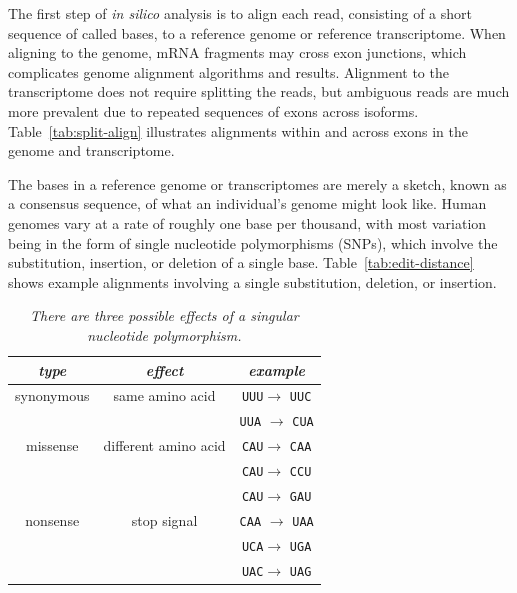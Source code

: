 \documentclass[11pt]{report}
\newcommand{\mybase}[1]{\texttt{#1}\xspace}
\newcommand{\baseA}{\mybase{A}}
\newcommand{\baseC}{\mybase{C}}
\newcommand{\baseG}{\mybase{G}}
\newcommand{\baseU}{\mybase{U}}
\newcommand{\mycaption}[2]{\caption{\small\it #2}\label{#1}}
\begin{document}
The first step of \textit{in silico} analysis is to align each read,
consisting of a short sequence of called bases, to a reference genome
or reference transcriptome. When aligning to the genome, mRNA
fragments may cross exon junctions, which complicates genome alignment
algorithms and results. Alignment to the transcriptome does not
require splitting the reads, but ambiguous reads are much more
prevalent due to repeated sequences of exons across isoforms.
Table~\ref{tab:split-align} illustrates alignments within and across
exons in the genome and transcriptome.

The bases in a reference genome or transcriptomes are merely a sketch,
known as a consensus sequence, of what an individual's genome might
look like. Human genomes vary at a rate of roughly one base per
thousand, with most variation being in the form of single nucleotide
polymorphisms (SNPs), which involve the substitution, insertion, or
deletion of a single base. Table~\ref{tab:edit-distance} shows example
alignments involving a single substitution, deletion, or insertion.

\begin{table}[t!]
  \centering
  \begin{tabular}{c|c|c}
    \textit{type} & \textit{effect} & \textit{example}
    \\ \hline
    synonymous & same amino acid & \baseU{}\baseU{}\baseU $\rightarrow$ \baseU{}\baseU{}\baseC
    \\
                  & & \baseU{}\baseU{}\baseA{} $\rightarrow$ \baseC{}\baseU{}\baseA
    \\ \hline
    missense & different amino acid & \baseC{}\baseA{}\baseU $\rightarrow$ \baseC{}\baseA{}\baseA
    \\
                  & & \baseC{}\baseA{}\baseU $\rightarrow$ \baseC{}\baseC{}\baseU
    \\
                  & & \baseC{}\baseA{}\baseU $\rightarrow$ \baseG{}\baseA{}\baseU
    \\ \hline
    nonsense & stop signal & \baseC{}\baseA{}\baseA{} $\rightarrow$ \baseU{}\baseA{}\baseA{}
    \\
                  & & \baseU{}\baseC{}\baseA $\rightarrow$ \baseU{}\baseG{}\baseA
    \\
                  & & \baseU{}\baseA{}\baseC $\rightarrow$ \baseU{}\baseA{}\baseG
  \end{tabular}
  \mycaption{tab:snp-types}{There are three possible effects of a singular nucleotide polymorphism.}
\end{table}
\end{document}
